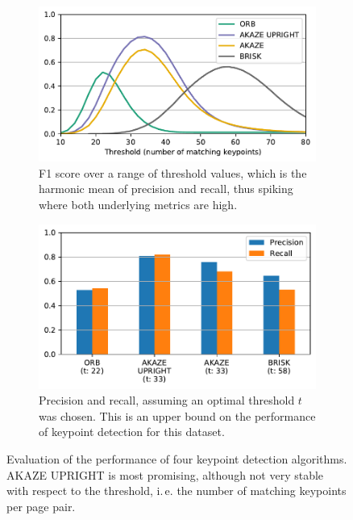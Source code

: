 \documentclass{ltjarticle}
\begin{document}
\begin{figure}
     \centering
     \begin{subfigure}[b]{\textwidth}
         \centering
         \includegraphics[width=\textwidth]{keypoints_f1}
         \caption{F1 score over a range of threshold values, which is the harmonic mean of precision and recall, thus spiking where both underlying metrics are high.}
     \end{subfigure}
     \begin{subfigure}[b]{\textwidth}
         \centering
         \includegraphics[width=\textwidth]{keypoints_optimal}
         \caption{Precision and recall, assuming an optimal threshold $t$ was chosen. This is an upper bound on the performance of keypoint detection for this dataset.}
     \end{subfigure}
        \caption{Evaluation of the performance of four keypoint detection algorithms. AKAZE UPRIGHT is most promising, although not very stable with respect to the threshold, i.\,e. the number of matching keypoints per page pair.}
        \label{fig:keypoint-evaluation}
\end{figure}
\end{document}
